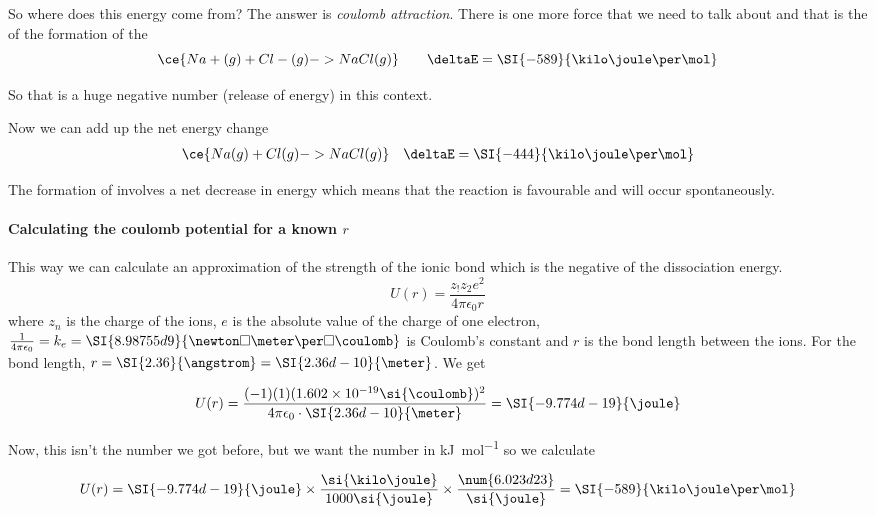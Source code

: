 \documentclass[../mit-general-chemistry.tex]{subfiles}
\begin{document}
So where does this energy come from? The answer is {\em coulomb
  attraction}. There is one more force that we need to talk about
and that is the \deltaE of the formation of the 
\begin{equation*}
  \ce{Na+(g) + Cl-(g) -> NaCl(g)} \qquad \deltaE = \SI{-589}{\kilo\joule\per\mol} \\
\end{equation*}

So that is a huge negative number (release of energy) in this context.

Now we can add up the net energy change
\begin{align*}
  &\ce{Na(g) + Cl(g) -> NaCl(g)} & \deltaE = \SI{-444}{\kilo\joule\per\mol} \\
\end{align*}

The formation of  involves a net decrease in energy which
means that the reaction is favourable and will occur spontaneously.




\paragraph{Calculating the coulomb potential for a known $r$}
This way we can calculate an approximation of the strength of the
ionic bond which is the negative of the dissociation energy.
\begin{equation*}
  U(r) = \frac{z_!z_2e^2}{4\pi\epsilon_0r}
\end{equation*}
where $z_n$ is the charge of the ions, $e$ is the absolute value of
the charge of one electron, $\frac{1}{4\pi\epsilon_0} = k_e =
\SI{8.98755d9}{\newton\square\meter\per\square\coulomb}$ is Coulomb's
constant and $r$ is the bond length between the ions. For 
the bond length, $r = \SI{2.36}{\angstrom} =
\SI{2.36d-10}{\meter}$. We get

\begin{equation*}
  U(r) = \frac{(-1)(1)(1.602\times 10^{-19}\si{\coulomb})^2}{4\pi\epsilon_0\cdot\SI{2.36d-10}{\meter}} 
  = \SI{-9.774d-19}{\joule}
\end{equation*}

Now, this isn't the number we got before, but we want the number in
\si{\kilo\joule\per\mol} so we calculate

\begin{equation*}
  U(r) = \SI{-9.774d-19}{\joule} \times \frac{\si{\kilo\joule}}{1000
    \si{\joule}} \times \frac{\num{6.023d23}}{\si{\joule}} = \SI{-589}{\kilo\joule\per\mol}
\end{equation*}
\end{document}
